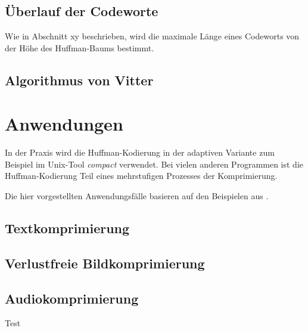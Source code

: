 \documentclass[twoside,11pt,a4paper]{article}
\theoremstyle{break}
\begin{document}
\subsection{Überlauf der Codeworte}

Wie in Abschnitt xy beschrieben, wird die maximale Länge eines
Codeworts von der Höhe des Huffman-Baums bestimmt.


\subsection{Algorithmus von Vitter}

\section{Anwendungen}

In der Praxis wird die Huffman-Kodierung in der adaptiven Variante zum
Beispiel im Unix-Tool \emph{compact} verwendet. Bei vielen anderen
Programmen ist die Huffman-Kodierung Teil eines mehrstufigen Prozesses
der Komprimierung.


Die hier vorgestellten Anwendungsfälle basieren auf den Beispielen aus
\cite{Sayood:2006}.

\subsection{Textkomprimierung}

\subsection{Verlustfreie Bildkomprimierung}

\subsection{Audiokomprimierung}


Test \cite{Salomon:2010}  \cite{Williams:1991}



\end{document}

